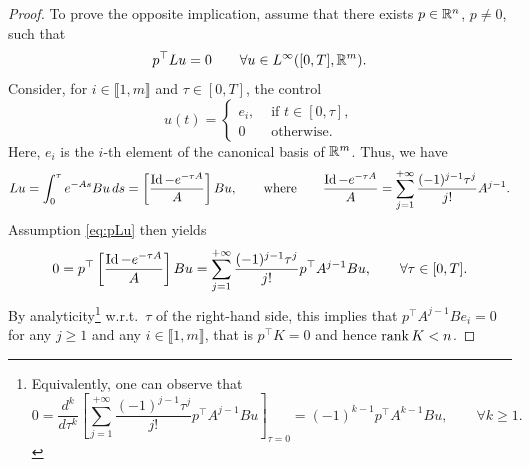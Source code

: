 \begin{proof}
    To prove the opposite implication, assume that there exists $p\in \mathbb{R}^n$, $p\neq0$, such that 
    \begin{equation}
        \label{eq:pLu}
        p^\top Lu=0\qquad \forall u\in L^\infty([0,T],\mathbb{R}^m). 
    \end{equation}
    Consider, for $i\in \llbracket 1,m\rrbracket$ and $\tau\in [0,T]$, the control
     \begin{equation}
         u(t) =
         \begin{cases}
             e_i, & \text{ if } t\in[0,\tau],\\
             0 & \text{ otherwise.}
         \end{cases}
     \end{equation}
     Here, $e_i$ is the $i$-th element of the canonical basis of $\mathbb{R}^m$. Thus, we have
    \begin{equation}
        Lu = \int_0^\tau e^{-As}Bu\,ds = \left[\frac{\operatorname{Id} - e^{-\tau A}}{A}\right] B u, \qquad
        \text{where}\qquad 
        \frac{\operatorname{Id} - e^{-\tau A}}{A} = \sum_{j=1}^{+\infty} \frac{(-1)^{j-1}\tau^j}{j!}A^{j-1}.
    \end{equation}
    Assumption \eqref{eq:pLu} then yields 
    \begin{equation}
       0 = p^\top\left[\frac{\operatorname{Id} - e^{-\tau A}}{A}\right]Bu = \sum_{j=1}^{+\infty} \frac{(-1)^{j-1}\tau^j}{j!}p^{\top}A^{j-1}Bu , 
       \qquad \forall \tau\in [0,T].
    \end{equation}
    By analyticity\footnote{Equivalently, one can observe that $$0=\frac{d^k}{d\tau^k}\left[\sum_{j=1}^{+\infty} \frac{(-1)^{j-1}\tau^j}{j!}p^{\top}A^{j-1}Bu\right]_{\tau =0} = (-1)^{k-1}p^\top A^{k-1}Bu, \qquad \forall k\ge 1.$$} w.r.t.~$\tau$ of the right-hand side, this implies that $p^\top A^{j-1}Be_i=0$ for any $j\ge1$ and any $i\in\llbracket1,m\rrbracket$, that is $p^\top K=0$ and hence $\operatorname{rank} K<n$.
\end{proof}


